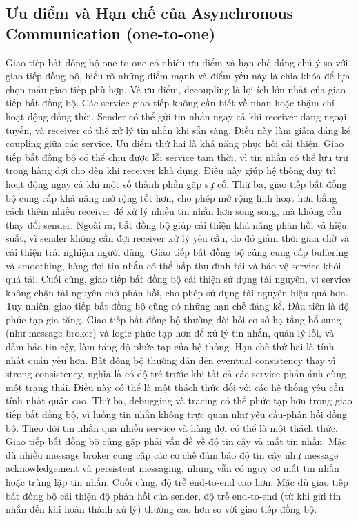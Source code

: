 \subsection{Ưu điểm và Hạn chế của Asynchronous Communication (one-to-one)}
Giao tiếp bất đồng bộ one-to-one có nhiều ưu điểm và hạn chế đáng chú ý so với giao tiếp đồng bộ, hiểu rõ những điểm mạnh và điểm yếu này là chìa khóa để lựa chọn mẫu giao tiếp phù hợp.
Về ưu điểm, decoupling là lợi ích lớn nhất của giao tiếp bất đồng bộ. Các service giao tiếp không cần biết về nhau hoặc thậm chí hoạt động đồng thời. Sender có thể gửi tin nhắn ngay cả khi receiver đang ngoại tuyến, và receiver có thể xử lý tin nhắn khi sẵn sàng. Điều này làm giảm đáng kể coupling giữa các service. Ưu điểm thứ hai là khả năng phục hồi cải thiện. Giao tiếp bất đồng bộ có thể chịu được lỗi service tạm thời, vì tin nhắn có thể lưu trữ trong hàng đợi cho đến khi receiver khả dụng. Điều này giúp hệ thống duy trì hoạt động ngay cả khi một số thành phần gặp sự cố. Thứ ba, giao tiếp bất đồng bộ cung cấp khả năng mở rộng tốt hơn, cho phép mở rộng linh hoạt hơn bằng cách thêm nhiều receiver để xử lý nhiều tin nhắn hơn song song, mà không cần thay đổi sender. Ngoài ra, bất đồng bộ giúp cải thiện khả năng phản hồi và hiệu suất, vì sender không cần đợi receiver xử lý yêu cầu, do đó giảm thời gian chờ và cải thiện trải nghiệm người dùng. Giao tiếp bất đồng bộ cũng cung cấp buffering và smoothing, hàng đợi tin nhắn có thể hấp thụ đỉnh tải và bảo vệ service khỏi quá tải. Cuối cùng, giao tiếp bất đồng bộ cải thiện sử dụng tài nguyên, vì service không chặn tài nguyên chờ phản hồi, cho phép sử dụng tài nguyên hiệu quả hơn.
Tuy nhiên, giao tiếp bất đồng bộ cũng có những hạn chế đáng kể. Đầu tiên là độ phức tạp gia tăng. Giao tiếp bất đồng bộ thường đòi hỏi cơ sở hạ tầng bổ sung (như message broker) và logic phức tạp hơn để xử lý tin nhắn, quản lý lỗi, và đảm bảo tin cậy, làm tăng độ phức tạp của hệ thống. Hạn chế thứ hai là tính nhất quán yếu hơn. Bất đồng bộ thường dẫn đến eventual consistency thay vì strong consistency, nghĩa là có độ trễ trước khi tất cả các service phản ánh cùng một trạng thái. Điều này có thể là một thách thức đối với các hệ thống yêu cầu tính nhất quán cao. Thứ ba, debugging và tracing có thể phức tạp hơn trong giao tiếp bất đồng bộ, vì luồng tin nhắn không trực quan như yêu cầu-phản hồi đồng bộ. Theo dõi tin nhắn qua nhiều service và hàng đợi có thể là một thách thức. Giao tiếp bất đồng bộ cũng gặp phải vấn đề về độ tin cậy và mất tin nhắn. Mặc dù nhiều message broker cung cấp các cơ chế đảm bảo độ tin cậy như message acknowledgement và persistent messaging, nhưng vẫn có nguy cơ mất tin nhắn hoặc trùng lặp tin nhắn. Cuối cùng, độ trễ end-to-end cao hơn. Mặc dù giao tiếp bất đồng bộ cải thiện độ phản hồi của sender, độ trễ end-to-end (từ khi gửi tin nhắn đến khi hoàn thành xử lý) thường cao hơn so với giao tiếp đồng bộ.
